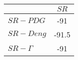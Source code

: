 \begin{tabular}{l|c}
\toprule
{} &  $SR$ \\
\midrule
\textbf{$SR-PDG$   } &   -91 \\
\textbf{$SR-Deng$  } & -91.5 \\
\textbf{$SR-\Gamma$} &   -91 \\
\bottomrule
\end{tabular}
